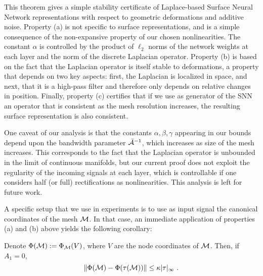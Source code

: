 This theorem gives a simple stability certificate of Laplace-based Surface Neural 
Network representations with respect to geometric deformations and 
additive noise. Property (a) is not specific to surface representations, and 
is a simple consequence of the non-expansive property of our chosen 
nonlinearities. The constant $\alpha$ is controlled by the product 
of $\ell_2$ norms of the network weights at each layer and the 
norm of the discrete Laplacian operator. 
Property (b) is based on the fact that the Laplacian operator 
is itself stable to deformations, a property that 
depends on two key aspects: first, the Laplacian is localized 
in space, and next, that it is a high-pass filter and therefore only depends 
on relative changes in position. 
Finally, property (c) certifies that if we use as generator 
of the SNN an operator that is consistent as the mesh resolution 
increases, the resulting surface representation is also consistent. 

One caveat of our analysis is that the constants $\alpha, \beta, \gamma$ 
appearing in our bounds depend upon the bandwidth parameter $\bar{{\mathcal A}}^{-1}$, which increases
as size of the mesh increases. This corresponds to the 
fact that the Laplacian operator is unbounded in the limit of continuous manifolds, 
but our current proof does not exploit the regularity of the incoming signals 
at each layer, which is controllable if one considers half (or full) rectifications 
as nonlinearities. This analysis is left for future work.




A specific setup that we use in experiments is to 
use as input signal the canonical coordinates of the mesh ${\mathcal{M}}$.
In that case, an immediate application of properties (a) and (b) above yields
the following corollary:
\begin{corollary}
\label{corocombine}
Denote $\Phi({\mathcal{M}}) := \Phi_{{\mathcal{M}}}(V)$, where $V$ are the node coordinates of ${\mathcal{M}}$. 
Then, if $A_1 =0 $, 
\begin{equation}
\| \Phi({\mathcal{M}}) - \Phi(\tau({\mathcal{M}})) \| \leq \kappa | \tau |_\infty~.
\end{equation}
\end{corollary}


